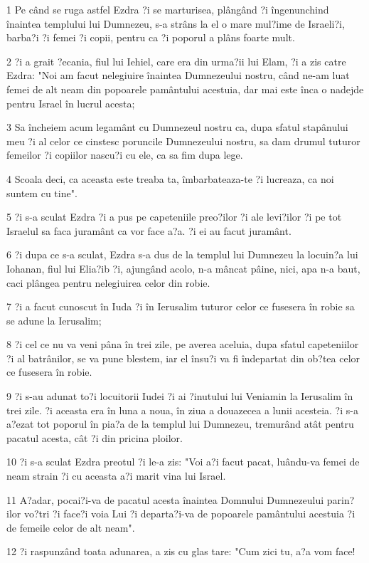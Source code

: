 \par 1 Pe când se ruga astfel Ezdra ?i se marturisea, plângând ?i îngenunchind înaintea templului lui Dumnezeu, s-a strâns la el o mare mul?ime de Israeli?i, barba?i ?i femei ?i copii, pentru ca ?i poporul a plâns foarte mult.
\par 2 ?i a grait ?ecania, fiul lui Iehiel, care era din urma?ii lui Elam, ?i a zis catre Ezdra: "Noi am facut nelegiuire înaintea Dumnezeului nostru, când ne-am luat femei de alt neam din popoarele pamântului acestuia, dar mai este înca o nadejde pentru Israel în lucrul acesta;
\par 3 Sa încheiem acum legamânt cu Dumnezeul nostru ca, dupa sfatul stapânului meu ?i al celor ce cinstesc poruncile Dumnezeului nostru, sa dam drumul tuturor femeilor ?i copiilor nascu?i cu ele, ca sa fim dupa lege.
\par 4 Scoala deci, ca aceasta este treaba ta, îmbarbateaza-te ?i lucreaza, ca noi suntem cu tine".
\par 5 ?i s-a sculat Ezdra ?i a pus pe capeteniile preo?ilor ?i ale levi?ilor ?i pe tot Israelul sa faca juramânt ca vor face a?a. ?i ei au facut juramânt.
\par 6 ?i dupa ce s-a sculat, Ezdra s-a dus de la templul lui Dumnezeu la locuin?a lui Iohanan, fiul lui Elia?ib ?i, ajungând acolo, n-a mâncat pâine, nici, apa n-a baut, caci plângea pentru nelegiuirea celor din robie.
\par 7 ?i a facut cunoscut în Iuda ?i în Ierusalim tuturor celor ce fusesera în robie sa se adune la Ierusalim;
\par 8 ?i cel ce nu va veni pâna în trei zile, pe averea aceluia, dupa sfatul capeteniilor ?i al batrânilor, se va pune blestem, iar el însu?i va fi îndepartat din ob?tea celor ce fusesera în robie.
\par 9 ?i s-au adunat to?i locuitorii Iudei ?i ai ?inutului lui Veniamin la Ierusalim în trei zile. ?i aceasta era în luna a noua, în ziua a douazecea a lunii acesteia. ?i s-a a?ezat tot poporul în pia?a de la templul lui Dumnezeu, tremurând atât pentru pacatul acesta, cât ?i din pricina ploilor.
\par 10 ?i s-a sculat Ezdra preotul ?i le-a zis: "Voi a?i facut pacat, luându-va femei de neam strain ?i cu aceasta a?i marit vina lui Israel.
\par 11 A?adar, pocai?i-va de pacatul acesta înaintea Domnului Dumnezeului parin?ilor vo?tri ?i face?i voia Lui ?i departa?i-va de popoarele pamântului acestuia ?i de femeile celor de alt neam".
\par 12 ?i raspunzând toata adunarea, a zis cu glas tare: "Cum zici tu, a?a vom face!
